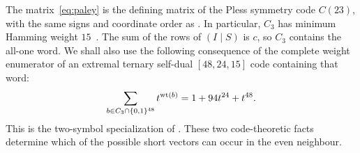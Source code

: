 The matrix~\eqref{eq:paley} is the defining matrix of the Pless symmetry
code $C(23)$, with the same signs and coordinate order as
\cite[Section~1]{tonchev}. In particular, $C_3$ has minimum Hamming
weight $15$~\cite{pless,tonchev}. The sum of the rows of $(I\mid S)$
is $c$, so $C_3$ contains the all-one word. We shall also use the
following consequence of the complete weight enumerator of an extremal
ternary self-dual $[48,24,15]$ code containing that word:
\begin{equation}\label{eq:binary-words}
 \sum_{b\in C_3\cap\{0,1\}^{48}} t^{\operatorname{wt}(b)}
   =1+94t^{24}+t^{48}.
\end{equation}
This is the two-symbol specialization of
\cite[equation~(20)]{munemasa-tamura}. These two code-theoretic facts
determine which of the possible short vectors can occur in the even
neighbour.

